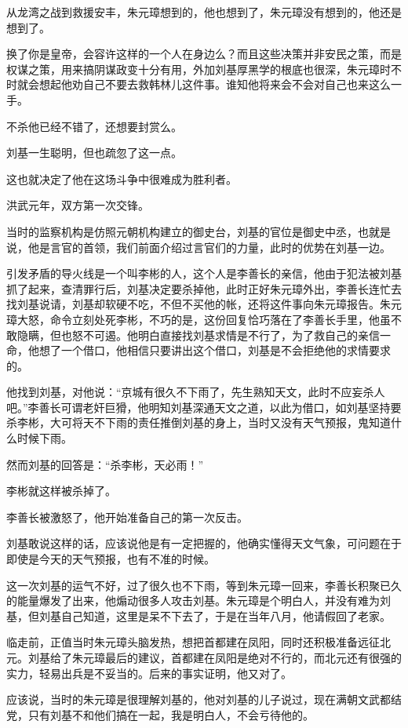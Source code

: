 \begin{multicols}{\theparacolNo}
		从龙湾之战到救援安丰，朱元璋想到的，他也想到了，朱元璋没有想到的，他还是想到了。

		换了你是皇帝，会容许这样的一个人在身边么？而且这些决策并非安民之策，而是权谋之策，用来搞阴谋政变十分有用，外加刘基厚黑学的根底也很深，朱元璋时不时就会想起他劝自己不要去救韩林儿这件事。谁知他将来会不会对自己也来这么一手。

		不杀他已经不错了，还想要封赏么。

		刘基一生聪明，但也疏忽了这一点。

		这也就决定了他在这场斗争中很难成为胜利者。

		洪武元年，双方第一次交锋。

		当时的监察机构是仿照元朝机构建立的御史台，刘基的官位是御史中丞，也就是说，他是言官的首领，我们前面介绍过言官们的力量，此时的优势在刘基一边。

		引发矛盾的导火线是一个叫李彬的人，这个人是李善长的亲信，他由于犯法被刘基抓了起来，查清罪行后，刘基决定要杀掉他，此时正好朱元璋外出，李善长连忙去找刘基说请，刘基却软硬不吃，不但不买他的帐，还将这件事向朱元璋报告。朱元璋大怒，命令立刻处死李彬，不巧的是，这份回复恰巧落在了李善长手里，他虽不敢隐瞒，但也怒不可遏。他明白直接找刘基求情是不行了，为了救自己的亲信一命，他想了一个借口，他相信只要讲出这个借口，刘基是不会拒绝他的求情要求的。

		他找到刘基，对他说：“京城有很久不下雨了，先生熟知天文，此时不应妄杀人吧。”李善长可谓老奸巨猾，他明知刘基深通天文之道，以此为借口，如刘基坚持要杀李彬，大可将天不下雨的责任推倒刘基的身上，当时又没有天气预报，鬼知道什么时候下雨。

		然而刘基的回答是：“杀李彬，天必雨！”

		李彬就这样被杀掉了。

		李善长被激怒了，他开始准备自己的第一次反击。

		刘基敢说这样的话，应该说他是有一定把握的，他确实懂得天文气象，可问题在于即使是今天的天气预报，也有不准的时候。

		这一次刘基的运气不好，过了很久也不下雨，等到朱元璋一回来，李善长积聚已久的能量爆发了出来，他煽动很多人攻击刘基。朱元璋是个明白人，并没有难为刘基，但刘基自己知道，这里是呆不下去了，于是在当年八月，他请假回了老家。

		临走前，正值当时朱元璋头脑发热，想把首都建在凤阳，同时还积极准备远征北元。刘基给了朱元璋最后的建议，首都建在凤阳是绝对不行的，而北元还有很强的实力，轻易出兵是不妥当的。后来的事实证明，他又对了。

		应该说，当时的朱元璋是很理解刘基的，他对刘基的儿子说过，现在满朝文武都结党，只有刘基不和他们搞在一起，我是明白人，不会亏待他的。


\end{multicols}
